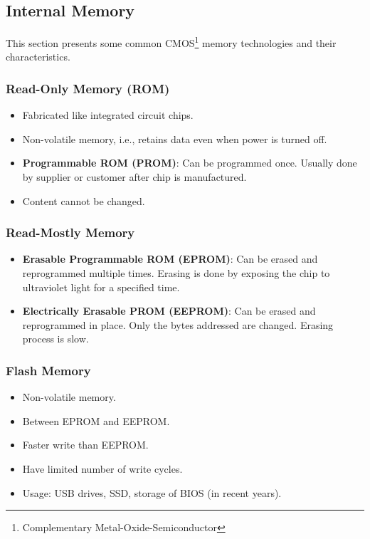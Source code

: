 \subsection{Internal Memory}

This section presents some common CMOS\footnote{Complementary Metal-Oxide-Semiconductor} memory
technologies and their characteristics.

\subsubsection{Read-Only Memory (ROM)}

\begin{itemize}
    \item Fabricated like integrated circuit chips.
    \item Non-volatile memory, i.e., retains data even when power is turned off.
    \item \textbf{Programmable ROM (PROM)}: Can be programmed once. Usually done by supplier
        or customer after chip is manufactured.
    \item Content cannot be changed.
\end{itemize}

\subsubsection{Read-Mostly Memory}

\begin{itemize}
    \item \textbf{Erasable Programmable ROM (EPROM)}: Can be erased and reprogrammed multiple times.
        Erasing is done by exposing the chip to ultraviolet light for a specified time.
    \item \textbf{Electrically Erasable PROM (EEPROM)}: Can be erased and reprogrammed in place.
        Only the bytes addressed are changed. Erasing process is slow.
\end{itemize}

\subsubsection{Flash Memory}

\begin{itemize}
    \item Non-volatile memory.
    \item Between EPROM and EEPROM.
    \item Faster write than EEPROM.
    \item Have limited number of write cycles.
    \item Usage: USB drives, SSD, storage of BIOS (in recent years).
\end{itemize}

